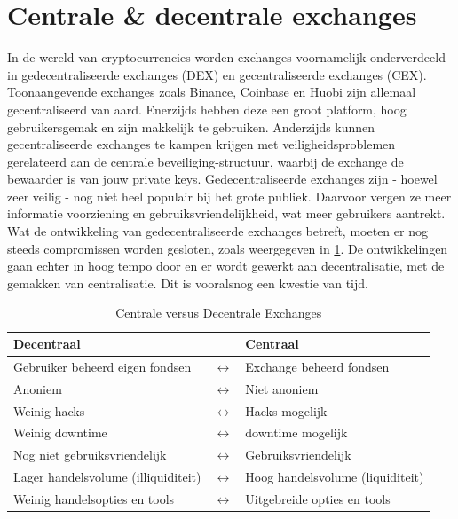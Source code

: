 \section{Centrale \& decentrale exchanges}
\label{sec:centralizedvsdecentralized}
In de wereld van cryptocurrencies worden exchanges voornamelijk onderverdeeld in gedecentraliseerde exchanges (DEX) en gecentraliseerde exchanges (CEX). Toonaangevende exchanges zoals Binance, Coinbase en Huobi zijn allemaal gecentraliseerd van aard. Enerzijds hebben deze een groot platform, hoog gebruikersgemak en zijn makkelijk te gebruiken. Anderzijds kunnen gecentraliseerde exchanges te kampen krijgen met veiligheidsproblemen gerelateerd aan de centrale beveiliging-structuur, waarbij de exchange de bewaarder is van jouw private keys. Gedecentraliseerde exchanges zijn - hoewel zeer veilig - nog niet heel populair bij het grote publiek. Daarvoor vergen ze meer informatie voorziening en gebruiksvriendelijkheid, wat meer gebruikers aantrekt. Wat de ontwikkeling van gedecentraliseerde exchanges betreft, moeten er nog steeds compromissen worden gesloten, zoals weergegeven in \cref{tab:centralizedvsdecentralized}. De ontwikkelingen gaan echter in hoog tempo door en er wordt gewerkt aan decentralisatie, met de gemakken van centralisatie. Dit is vooralsnog een kwestie van tijd. \medskip



\begin{table}[htb]

\centering

\caption{Centrale versus Decentrale Exchanges}
\begin{tabular}{lcl} 
\toprule
\textbf{Decentraal}         & & \textbf{Centraal}                 \\
\midrule
Gebruiker beheerd eigen fondsen       &$\longleftrightarrow$      & Exchange beheerd fondsen              \\
Anoniem            &$\longleftrightarrow$           & Niet anoniem                        \\
Weinig hacks &$\longleftrightarrow$  & Hacks mogelijk  \\
Weinig downtime &$\longleftrightarrow$  & downtime mogelijk  \\
Nog niet gebruiksvriendelijk    &$\longleftrightarrow$     & Gebruiksvriendelijk                 \\
Lager handelsvolume (illiquiditeit) &$\longleftrightarrow$ & Hoog handelsvolume (liquiditeit)              \\
Weinig handelsopties en tools &$\longleftrightarrow$ & Uitgebreide opties en tools           \\
\bottomrule
\end{tabular}
\label{tab:centralizedvsdecentralized}
\end{table}



